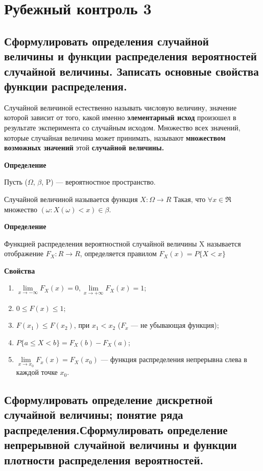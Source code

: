 \section{Рубежный контроль 3}

\subsection{Сформулировать определения случайной величины и функции распределения вероятностей случайной величины. Записать основные свойства функции распределения.}

Случайной величиной естественно называть числовую величину, значение которой зависит от того, какой именно \textbf{элементарный исход} произошел в результате эксперимента со случайным исходом.
Множество всех значений, которые случайная величина может принимать, называют \textbf{множеством возможных значений} этой \textbf{случайной величины.}

\textbf{Определение}

Пусть ($\Omega$, $\beta$, P) --- вероятностное пространство.

Случайной величиной называется функция $X : \Omega \rightarrow R$
Такая, что $\forall x \in \Re$ множество $(\omega : X (\omega) < x) \in \beta$.

\textbf{Определение}

Функцией распределения вероятностной случайной величины X называется отображение $F_X : R \rightarrow R$, определяется правилом $F_X(x) = P\{X < x\}$

\textbf{Свойства}

\begin{enumerate}[label=\arabic*.]
	\item $\lim\limits_{x \rightarrow -\infty}F_X(x) = 0, \lim\limits_{x \rightarrow +\infty}F_X(x) = 1$;
	\item $0 \leq F(x) \leq 1$;
	\item $F(x_1) \leq F(x_2)$, при $x_1 < x_2$ ($F_x$ --- не убывающая функция);
	\item $P\{a \leq X < b\} = F_X(b) - F_X(a)$;
	\item $\lim\limits_{x \rightarrow x_0}F_x(x) = F_X(x_0)$ --- функция распределения непрерывна слева в каждой точке $x_0$.
\end{enumerate}

\subsection{Сформулировать определение дискретной случайной величины; понятие ряда распределения.Сформулировать определение непрерывной случайной величины и функции плотности распределения вероятностей.}

